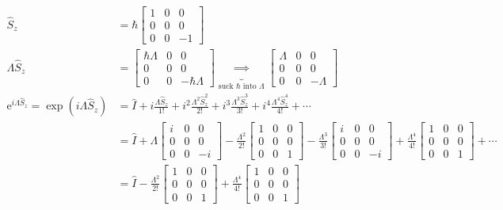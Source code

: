 \documentclass[letter, 10pts]{article}
\newcommand{\hb}{\hbar}
\begin{document}
\begin{align*}
	\hat{S}_z &= \hb 
	\begin{bmatrix} 1 & 0 & 0 \\ 0 & 0 & 0 \\ 0 & 0 & -1 \end{bmatrix} \\
	\Lambda \hat{S}_z &= 
	\begin{bmatrix} \hb \Lambda & 0 & 0 \\ 0 & 0 & 0 \\ 0 & 0 & -\hb \Lambda \end{bmatrix} 
	\underbrace{\implies}_{\text{suck $\hb$ into  $\Lambda $}} 
	\begin{bmatrix} \Lambda & 0 & 0 \\ 0 & 0 & 0 \\ 0 & 0 & - \Lambda \end{bmatrix} 
	\\
	\mathrm{e}^{ i \Lambda \hat{S}_z} = 
	\exp(  i \Lambda \hat{S}_z ) &= 
\hat{I} + i \frac{\Lambda \hat{S}_z}{1 !}  + 
i ^2 \frac{\Lambda ^2 \hat{S}_z ^2}{2!} + 
i ^3\frac{\Lambda^3 \hat{S}_z ^3}{3!} + 
i ^{4}\frac{\Lambda^4 \hat{S}_z ^4}{4!} + 
\cdots 
	\\
	&= 
\hat{I} + 
\Lambda 
	\begin{bmatrix} i&0&0\\0&0&0\\0&0&-i \end{bmatrix} 
	- 
	\frac{\Lambda^2}{2!}
	\begin{bmatrix} 1&0&0\\0&0&0\\0&0&1 \end{bmatrix} 
	-
	\frac{\Lambda^3}{3!}
	\begin{bmatrix} i&0&0\\0&0&0\\0&0&-i \end{bmatrix} 
	+ 
\frac{\Lambda^{4}}{4!}
	\begin{bmatrix} 1&0&0\\0&0&0\\0&0&1 \end{bmatrix}  
	+ \cdots
	\\
	&=  
\hat{I} 
	- 
	\frac{\Lambda^2}{2!}
	\begin{bmatrix} 1&0&0\\0&0&0\\0&0&1 \end{bmatrix}  
+ \frac{\Lambda^{4}}{4!}
	\begin{bmatrix} 1&0&0\\0&0&0\\0&0&1 \end{bmatrix}  

\end{align*}
\end{document}
